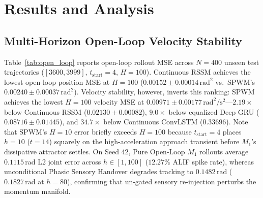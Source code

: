 \documentclass[11pt]{article}
\begin{document}
\section{Results and Analysis}

\subsection{Multi-Horizon Open-Loop Velocity Stability}

Table~\ref{tab:open_loop} reports open-loop rollout MSE across $N=400$ unseen test trajectories ($[3600, 3999]$, $t_{\text{start}}=4$, $H=100$). Continuous RSSM achieves the lowest open-loop position MSE at $H=100$ ($0.00152 \pm 0.00014\,\text{rad}^2$ vs.\ SPWM's $0.00240 \pm 0.00037\,\text{rad}^2$). Velocity stability, however, inverts this ranking: SPWM achieves the lowest $H=100$ velocity MSE at $0.00971 \pm 0.00177\,\text{rad}^2/\text{s}^2$---$2.19\times$ below Continuous RSSM ($0.02130 \pm 0.00082$), $9.0\times$ below equalized Deep GRU ($0.08716 \pm 0.01445$), and $34.7\times$ below Continuous ConvLSTM ($0.33696$). Note that SPWM's $H=10$ error briefly exceeds $H=100$ because $t_{\text{start}}=4$ places $h=10$ ($t=14$) squarely on the high-acceleration approach transient before $M_1$'s dissipative attractor settles. On Seed 42, Pure Open-Loop $M_1$ rollouts average $0.1115\,\text{rad}$ L2 joint error across $h \in [1, 100]$ ($12.27\%$ ALIF spike rate), whereas unconditional Phasic Sensory Handover degrades tracking to $0.1482\,\text{rad}$ ($0.1827\,\text{rad}$ at $h=80$), confirming that un-gated sensory re-injection perturbs the momentum manifold.
\end{document}
